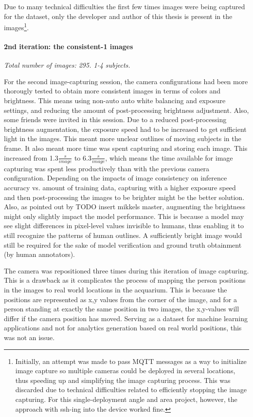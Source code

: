 Due to many technical difficulties the first few times images were being captured for the dataset, only the developer and author of this thesis is present in the images\footnote{Initially, an attempt was made to pass MQTT messages as a way to initialize image capture so multiple cameras could be deployed in several locations, thus speeding up and simplifying the image capturing process. This was discarded due to technical difficulties related to efficiently stopping the image capturing. For this single-deployment angle and area project, however, the approach with ssh-ing into the device worked fine.}.

\paragraph{2nd iteration: the consistent-1 images}
\textit{Total number of images: 295. 1-4 subjects.}

For the second image-capturing session, the camera configurations had been more thorougly tested to obtain more consistent images in terms of colors and brightness. This means using non-auto auto white balancing and exposure settings, and reducing the amount of post-processing brightness adjustment. Also, some friends were invited in this session. Due to a reduced post-processing brightness augmentation, the exposure speed had to be increased to get sufficient light in the images. This meant more unclear outlines of moving subjects in the frame. It also meant more time was spent capturing and storing each image. This increased from 1.3$\frac{s}{image}$ to 6.3$\frac{s}{image}$, which means the time available for image capturing was spent less productively than with the previous camera configuration. Depending on the impacts of image consistency on inference accuracy vs. amount of training data, capturing with a higher exposure speed and then post-processing the images to be brighter might be the better solution. Also, as pointed out by TODO insert mikkels master, augmenting the brightness might only slightly impact the model performance. This is because a model may see slight differences in pixel-level values invisible to humans, thus enabling it to still recognize the patterns of human outlines. A sufficiently bright image would still be required for the sake of model verification and ground truth obtainment (by human annotators).

The camera was repositioned three times during this iteration of image capturing. This is a drawback as it complicates the process of mapping the person positions in the images to real world locations in the acquarium. This is because the positions are represented as x,y values from the corner of the image, and for a person standing at exactly the same position in two images, the x,y-values will differ if the camera position has moved. Serving as a dataset for machine learning applications and not for analytics generation based on real world positions, this was not an issue.


